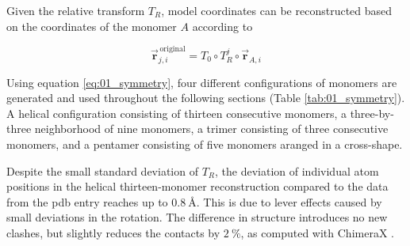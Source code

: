 Given the relative transform $T_R$, model coordinates can be reconstructed based on the coordinates of the monomer $A$ according to 

\begin{equation}\label{eq:01_symmetry}
\vec{\mathbf{r}}_{j,i}^{\,\text{original}} = T_0 \circ T_R^j \circ \vec{\mathbf{r}}_{A,i}
\end{equation}

Using equation \ref{eq:01_symmetry}, four different configurations of monomers are generated and used throughout the following sections (Table \ref{tab:01_symmetry}). A helical configuration consisting of thirteen consecutive monomers, a three-by-three neighborhood of nine monomers, a trimer consisting of three consecutive monomers, and a pentamer consisting of five monomers aranged in a cross-shape. 

Despite the small standard deviation of $T_R$, the deviation of individual atom positions in the helical thirteen-monomer reconstruction compared to the data from the pdb entry reaches up to $\SI{0.8}{\angstrom}$. This is due to lever effects caused by small deviations in the rotation. The difference in structure introduces no new clashes, but slightly reduces the contacts by $\SI{2}{\percent}$, as computed with ChimeraX \cite{ChimeraX2023}.